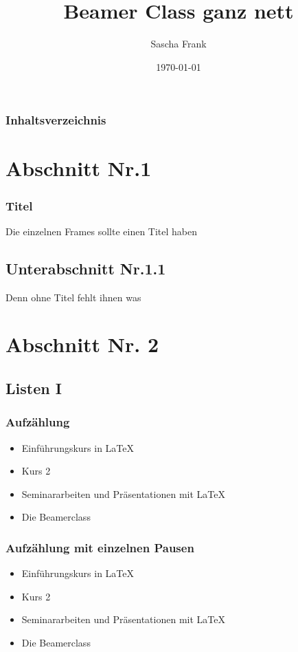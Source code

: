 \documentclass[hyperref={pdfpagelabels=false}]{beamer}
\title{Beamer Class ganz nett}
\author{Sascha Frank}
\date{\today}
\begin{document}
\begin{frame}
\titlepage
\end{frame} 

\begin{frame}
\frametitle{Inhaltsverzeichnis}
\tableofcontents
\end{frame} 


\section{Abschnitt Nr.1} 
\begin{frame}
\frametitle{Titel} 
Die einzelnen Frames sollte einen Titel haben 
\end{frame}
\subsection{Unterabschnitt Nr.1.1  }
\begin{frame} 
Denn ohne Titel fehlt ihnen was
\end{frame}


\section{Abschnitt Nr. 2} 
\subsection{Listen I}
\begin{frame}
\frametitle{Aufz\"ahlung}
\begin{itemize}
\item Einf\"uhrungskurs in \LaTeX{}  
\item Kurs 2  
\item Seminararbeiten und Pr\"asentationen mit \LaTeX{} 
\item Die Beamerclass 
\end{itemize} 
\end{frame}

\begin{frame}
\frametitle{Aufz\"ahlung mit einzelnen Pausen}
\begin{itemize}
\item  Einf\"uhrungskurs in \LaTeX{} \pause 
\item  Kurs 2 \pause 
\item  Seminararbeiten und Pr\"asentationen mit \LaTeX{} \pause 
\item  Die Beamerclass
\end{itemize} 
\end{frame}
\end{document}
